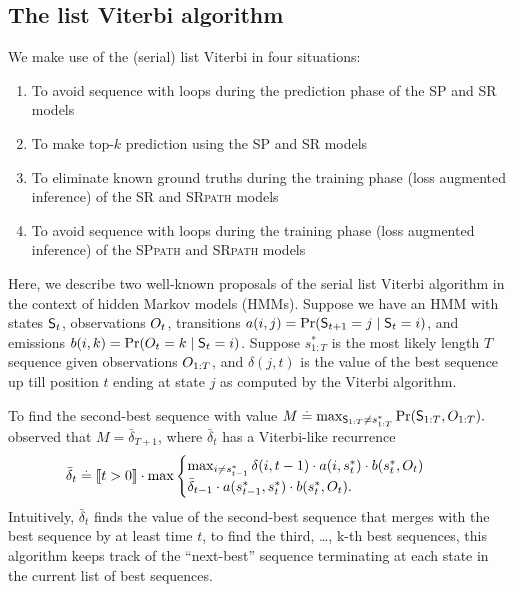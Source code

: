 \subsection{The list Viterbi algorithm}
\label{sec:listviterbi-supp}

We make use of the (serial) list Viterbi in four situations:
\begin{enumerate}
  \item To avoid sequence with loops during the prediction phase of the SP and SR models
  \item To make top-$k$ prediction using the SP and SR models
  \item To eliminate known ground truths during the training phase (\ie loss augmented inference) of the SR and \textsc{SRpath} models
  \item To avoid sequence with loops during the training phase (\ie loss augmented inference) of the \textsc{SPpath} and \textsc{SRpath} models
\end{enumerate}

Here, we describe two well-known proposals of the serial list Viterbi algorithm in the context of hidden Markov models (HMMs).
Suppose we have an HMM with states $\mathsf{S}_{t}$, observations $O_{t}$, transitions $a(i, j) = \Pr( \mathsf{S}_{t+1} = j \mid \mathsf{S}_t = i )$, and emissions $b(i, k) = \Pr( O_{t} = k \mid \mathsf{S}_t = i )$.
Suppose $s^*_{1:T}$ is the most likely length $T$ sequence given observations $O_{1:T}$, and
$\delta(j, t)$ is the value of the best sequence up till position $t$ ending at state $j$ as computed by the Viterbi algorithm.

To find the second-best sequence with value $ M \stackrel{.}{=} \max_{\mathsf{S}_{1:T} \neq s^*_{1 : T}}{\Pr( \mathsf{S}_{1:T}, O_{1:T} )}. $
\citet{seshadri1994list} observed that $M = \bar{\delta}_{T+1}$, where $\bar{\delta}_t$ has a Viterbi-like recurrence
\begin{equation}
    \label{eqn:att-recurrence}
    \begin{aligned}
        \bar{\delta}_t &\stackrel{.}{=} 
        \llbracket t > 0 \rrbracket \cdot
        \max
        \begin{cases}
        \max_{i \neq s^*_{t-1}} \delta(i, t-1) \cdot a( i, s^*_{t} ) \cdot b( s^*_{t}, O_{t} ) \\
        \bar{\delta}_{t - 1} \cdot a( s^*_{t - 1}, s^*_{t} ) \cdot b( s^*_{t}, O_{t} ).
        \end{cases}
    \end{aligned}
\end{equation}
Intuitively, $\bar{\delta}_t$ finds the value of the second-best sequence that merges with the best sequence by at least time $t$,
to find the third, \dots, k-th best sequences, this algorithm keeps track of the ``next-best'' sequence terminating at each state in the current list of best sequences.

